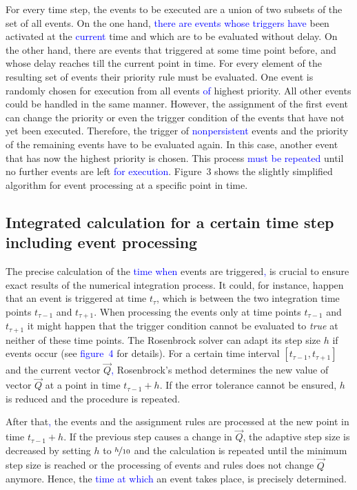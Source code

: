 \documentclass[10pt]{bmc_article}
\newenvironment{bmcformat}{\fussy\setboolean{publ}{true}}{\fussy}
\newcommand{\COR}[1]{\textcolor{blue}{#1}}
\newcommand{\true}{\emph{true}\xspace}
\begin{document}
\begin{bmcformat}
For every time step, the events to be executed are a union of two subsets of the set of all events.
On the one hand, \COR{there are events whose triggers have} been activated at the \COR{current} time and which are to be evaluated without delay.
On the other hand, there are events that triggered at some time point before, and whose delay reaches till the current point in time.
For every element of the resulting set of events their priority rule must be evaluated.
One event is randomly chosen for execution from all events \COR{of} highest priority.
All other events could be handled in the same manner.
However, the assignment of the first event can change the priority or even the trigger condition of the events that have not yet been executed.
Therefore, the trigger of \COR{nonpersistent} events and the priority of the remaining events have to be evaluated again.
In this case, another event that has now the highest priority is chosen.
This process \COR{must be repeated} until no further events are left \COR{for execution}.
Figure~3 shows the slightly simplified algorithm for event processing at a specific point in time.

\subsection*{Integrated calculation for a certain time step including event processing}
The precise calculation of the \COR{time when} events are triggered\COR{,} is crucial to 
ensure exact results of the numerical integration process.
It could, for instance, happen that an event is triggered at time $t_{\tau}$,
which is between the two integration time points $t_{\tau - 1}$ and $t_{\tau + 1}$.
When processing the events only at time points $t_{\tau - 1}$ and $t_{\tau + 1}$
it might happen that the trigger condition cannot be evaluated to \true at
neither of these time points. 
The Rosenbrock solver \cite{Press1993} can adapt its step size $h$ if events
occur (see \COR{figure~4} for details).
For a certain time interval $[t_{\tau - 1}, t_{\tau + 1}]$ and the current vector
$\vec{Q}$\COR{,} Rosenbrock's method determines the new value of vector $\vec{Q}$ at a
point in time $t_{\tau - 1} + h$.
If the error tolerance cannot be ensured, $h$ is reduced and the procedure is
repeated.

After that\COR{,} the events and the assignment rules are processed at the new point in
time $t_{\tau - 1} + h$.
If the previous step causes a change in $\vec{Q}$, the adaptive step size is
decreased by setting $h$ to $\nicefrac{h}{10}$ and the calculation is repeated
until the minimum step size is reached or the processing of events and rules
does not change $\vec{Q}$ anymore.
Hence, the \COR{time at which} an event takes place, is precisely determined.


\end{bmcformat}
\end{document}

